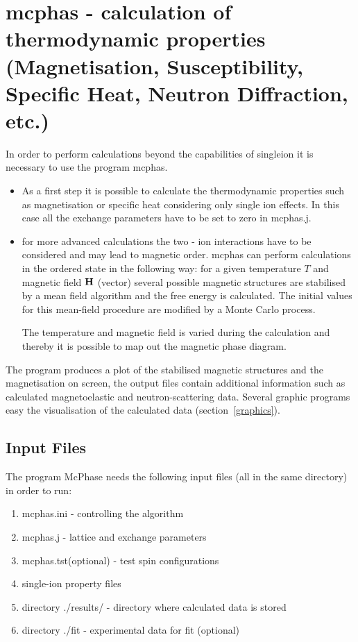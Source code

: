 \section{{\prg mcphas} - calculation of thermodynamic properties (Magnetisation, Susceptibility, Specific Heat, Neutron %
Diffraction, etc.)}
\label{runmcphas}

In order to perform calculations beyond the capabilities of {\prg singleion} it is necessary
to use the program {\prg mcphas}. 
\begin{itemize}
\item As a first step it is possible to
calculate the thermodynamic properties such as magnetisation or specific heat
considering only single ion effects. In this case all the exchange parameters
have to be set to zero in {\prg mcphas.j}. 
\item for more advanced calculations the two - ion interactions have to be
considered and may lead to magnetic order. {\prg mcphas} can perform 
calculations in the ordered state in the following way: for 
a given temperature $T$ and magnetic field $\mathbf H$ (vector)
several possible magnetic structures are stabilised
by a mean field algorithm and the free energy is 
calculated. The initial values for this mean-field procedure are
modified by a Monte Carlo process.


The temperature and magnetic field is varied during the calculation
and thereby it is possible to map out the magnetic phase diagram.
\end{itemize}

The program produces a plot of the stabilised magnetic
structures and the magnetisation on screen, the
output files contain additional information 
such as calculated magnetoelastic and  neutron-scattering
data. Several graphic programs easy the visualisation of the
calculated data (section~\ref{graphics}).



\subsection{Input Files}
The program {\prg McPhase} needs the following input files (all in the same directory)
 in order to run:

\begin{enumerate}
\item {\prg mcphas.ini}
 - controlling the algorithm
\item {\prg mcphas.j}
  - lattice and exchange parameters
\item {\prg mcphas.tst(optional)}  - test spin configurations
\item {\prg single-ion property files}
\item {\prg directory ./results/}
 - directory where calculated data is stored
\item {\prg directory ./fit} - experimental data for fit (optional)
\end{enumerate}


